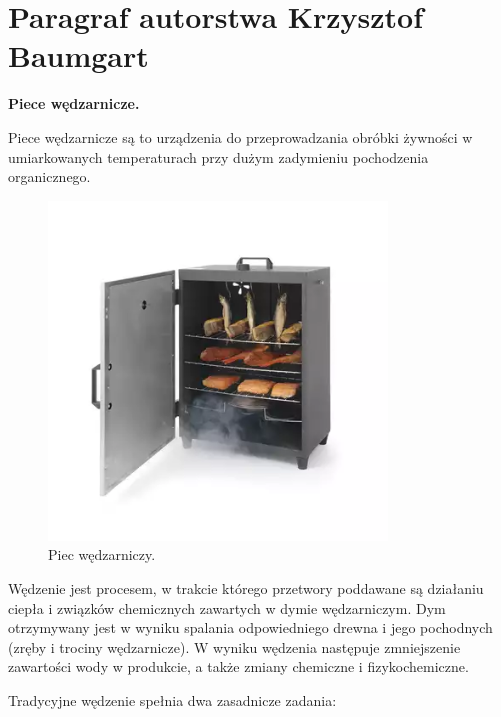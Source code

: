 \section{Paragraf autorstwa Krzysztof Baumgart}
\begin{flushleft}
    \textbf{Piece wędzarnicze.}
    
    \Large {Piece wędzarnicze są to urządzenia do przeprowadzania obróbki żywności w umiarkowanych temperaturach przy dużym zadymieniu pochodzenia organicznego.}
   
\begin{figure}[ht!]
\centering
\includegraphics[width=90mm]{pictures/piec.jpg}
\caption{Piec wędzarniczy. \label{overflow}}
\end{figure}
    
    Wędzenie jest procesem, w trakcie którego przetwory poddawane są działaniu ciepła i związków chemicznych zawartych w dymie wędzarniczym. Dym otrzymywany jest w wyniku spalania odpowiedniego drewna i jego pochodnych (zręby i trociny wędzarnicze). W wyniku wędzenia następuje zmniejszenie zawartości wody w produkcie, a także zmiany chemiczne i fizykochemiczne. 
    
    Tradycyjne wędzenie spełnia dwa zasadnicze zadania:
    
    
    
\end{flushleft}
